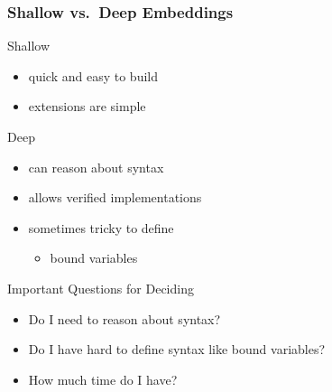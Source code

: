 \begin{frame}
\frametitle{Shallow vs.\ Deep Embeddings}

\newcommand{\dummyitem}{\item[] \leavevmode\phantom{gg}}

\begin{minipage}[t]{.46\textwidth}
\begin{block}{Shallow}
\begin{itemize}
\item quick and easy to build
\item extensions are simple
\end{itemize}
\end{block}
\end{minipage}\qquad
\begin{minipage}[t]{.46\textwidth}
\begin{block}{Deep}
\begin{itemize}
\item can reason about syntax
\item allows verified implementations
\item sometimes tricky to define 
\begin{itemize}
\item \eg bound variables
\end{itemize}
\end{itemize}
\end{block}
\end{minipage}
\bigskip

\begin{block}{Important Questions for Deciding}
\begin{itemize}
\item Do I need to reason about syntax?
\item Do I have hard to define syntax like bound variables?
\item How much time do I have?
\end{itemize}
\end{block}
\end{frame}

